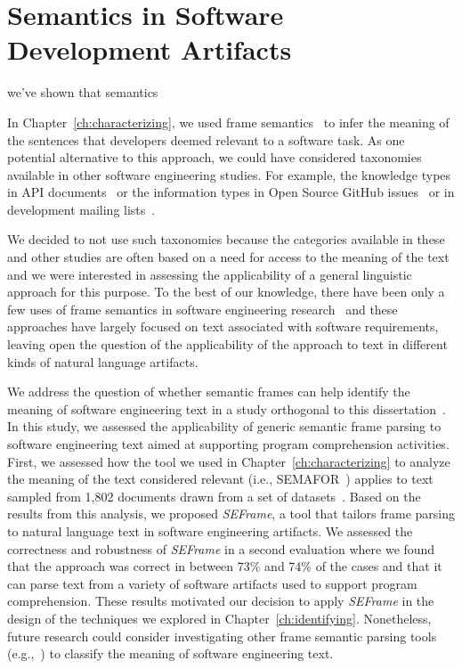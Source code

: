 

\section{Semantics in Software Development Artifacts}
\label{cp7:semantics}


we've shown that semantics 


In Chapter~\ref{ch:characterizing}, we used frame semantics~\cite{fillmore1976frame}
to infer the meaning of the sentences
that developers deemed relevant to  a software task.
As one potential alternative to this approach, 
we could have considered 
taxonomies
available in other software engineering studies. 
For example, the knowledge types in API documents~\cite{Maalej2013}
or the information types in Open Source GitHub issues~\cite{Arya2019} or 
in development mailing lists~\cite{Sorbo2015}.



We decided to not use such taxonomies because the categories available in these and other studies 
are often based
on a need for access to the meaning of
the text
and we were interested in assessing the
applicability of a general linguistic approach for this purpose.
To the best of our knowledge, there have been only a few uses of frame
semantics in software engineering research~\cite{jha2017, kundi2017, alhoshan2019using}
and these approaches
have largely focused on text associated
with software requirements, leaving open the
question of the applicability of the approach to
text in different kinds of natural language artifacts.



We address the question of whether semantic
frames can help identify the meaning of
software engineering text
in a study 
orthogonal to this dissertation~\cite{marques2021}. 
In this study, we assessed the applicability of generic semantic frame
parsing to software engineering text
aimed at supporting program
comprehension activities.
First, we assessed how the tool we used in Chapter~\ref{ch:characterizing}
to analyze the meaning of the text considered relevant (i.e., SEMAFOR~\cite{das2014frame})
 applies to text sampled from 1,802 documents drawn from a set of datasets~\cite{Arya2019, Xu2017, Maalej2013, Chaparro2017}. 
Based on the results from this analysis, 
we proposed \textit{SEFrame}, a tool that tailors 
frame parsing to natural language text in software engineering artifacts.
We assessed the correctness and robustness of \textit{SEFrame} in a second evaluation where we found that the approach was 
 correct in between 73\% and 74\% of
the cases and that it can parse text from a variety of software artifacts used to support program
comprehension. These results motivated our decision to apply \textit{SEFrame} 
in the design of the techniques we explored in Chapter~\ref{ch:identifying}.
Nonetheless,  
future research could consider
investigating other 
frame semantic parsing tools (e.g.,~\cite{swayamdipta17, chen2021joint}) 
to classify the meaning of software engineering text.
 




